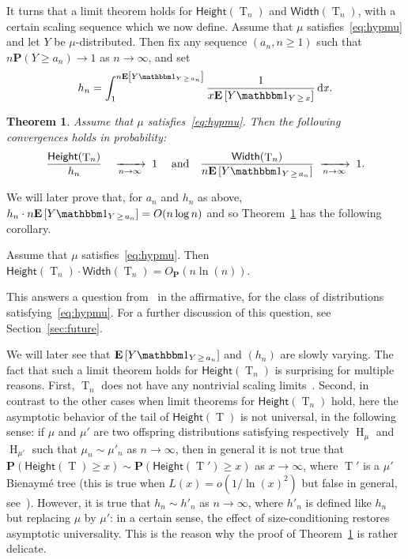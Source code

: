 \documentclass[10pt]{amsart}
\newtheorem{theo}{Theorem}[section]
\theoremstyle{definition}\newtheorem{defi}[theo]{Definition}\newtheorem{rema}[theo]{Remark}\newtheorem{exam}[theo]{Example}\newtheorem{exem}[theo]{Example}\newtheorem{nota}[theo]{Notation}
\renewcommand{\H}{\mathsf{Height}}
\newcommand{\p}{\mathbf{P}}
\newcommand{\Width}{\mathsf{Width}}
\newcommand{\E}[1]{{\mathbf E}\left[#1\right]}
\DeclareMathOperator{\rtree}{T}
\DeclareMathOperator{\dxseq}{d\mathit{x}}
\DeclareMathOperator{\rmH}{H}
\newcommand{\I}[1]{{\mathbbm 1}_{#1}}
\begin{document}
It turns that a limit theorem holds for $\H(\rtree_{n})$ and $\Width(\rtree_{n})$, with a certain scaling sequence which we now define. Assume that $\mu$ satisfies~\eqref{eq:hypmu} and let $Y$ be $\mu$-distributed. Then fix any sequence $(a_n,n \ge 1)$ such that $n \p(Y \ge a_n) \to 1$ as $n \to \infty$, and set
\begin{equation}\label{eq:hn}
h_n = \int_1^{n \E{Y\I{Y\,\ge\,a_n}}} \frac{1}{ x \E{Y \I{Y\,\ge\,x}}} \dxseq\!.
\end{equation}

\begin{theo}\label{thm:heightCauchy0}
Assume that $\mu$ satisfies~\eqref{eq:hypmu}. Then the following convergences holds in probability:
\[
\frac{\H(\rtree_{n})}{h_{n}} \quad \xrightarrow[n\to\infty]{} \; 1 \; \quad\text{and} \quad \frac{\Width(\rtree_{n})}{n \E{Y\I{Y\,\ge\,a_n}}} \; \xrightarrow[n\to\infty]{} \; 1.
\]
\end{theo}


We will later prove that, for $a_n$ and $h_n$ as above, $h_{n}\cdot n \E{Y\I{Y\,\ge\,a_n}}=O(n \log n)$ and so Theorem~\ref{thm:heightCauchy0} has the following corollary.
\begin{coro}\label{cor:hw}
Assume that $\mu$ satisfies~\eqref{eq:hypmu}. Then $\H(\rtree_{n}) \cdot \Width(\rtree_{n}) = O_{\p}({n \ln(n)})$.
\end{coro}

This answers a question from~\cite{Add19} in the affirmative, for the class of distributions satisfying~\eqref{eq:hypmu}. For a further discussion of this question, see Section~\ref{sec:future}.

We will later see that $\E{Y\I{Y\,\ge\,a_n}}$ and $(h_{n})$ are slowly varying. The fact that such a limit theorem holds for $\H(\rtree_{n})$ is surprising for multiple reasons. First, $\rtree_{n}$ does not have any nontrivial scaling limits~\cite{KR19}. Second, in contrast to the other cases when limit theorems for $\H(\rtree_{n})$ hold, here the asymptotic behavior of the tail of $\H(\rtree)$ is not universal, in the following sense: if $\mu$ and $\mu'$ are two offspring distributions satisfying respectively $\rmH_\mu$ and $\rmH_{\mu'}$ such that $\mu_n \sim \mu'_n$ as $n \rightarrow \infty$, then in general it is not true that $\p(\H(\rtree) \geq x) \sim \p(\H(\rtree') \geq x)$ as $ x \rightarrow \infty$, where $\rtree'$ is a $\mu'$ Bienaymé tree (this is true when $L(x)=o(1/\ln(x)^{2})$ but false in general, see~\cite[Section~3.2]{NW07}). However, it is true that $h_{n} \sim h'_{n}$ as $n \rightarrow \infty$, where $h'_{n}$ is defined like $h_{n}$ but replacing $\mu$ by $\mu'$: in a certain sense, the effect of size-conditioning restores asymptotic universality. This is the reason why the proof of Theorem~\ref{thm:heightCauchy0} is rather delicate.
\end{document}
